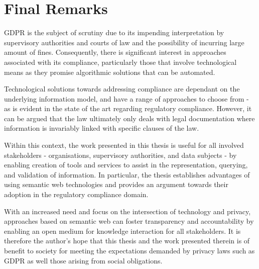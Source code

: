 \section{Final Remarks}\label{sec:conclusion-final-remarks}
GDPR is the subject of scrutiny due to its impending interpretation by supervisory authorities and courts of law and the possibility of incurring large amount of fines. Consequently, there is significant interest in approaches associated with its compliance, particularly those that involve technological means as they promise algorithmic solutions that can be automated.

Technological solutions towards addressing compliance are dependant on the underlying information model, and have a range of approaches to choose from - as is evident in the state of the art regarding regulatory compliance. However, it can be argued that the law ultimately only deals with legal documentation where information is invariably linked with specific clauses of the law.


Within this context, the work presented in this thesis is useful for all involved stakeholders - organisations, supervisory authorities, and data subjects - by enabling creation of tools and services to assist in the representation, querying, and validation of information. In particular, the thesis establishes advantages of using semantic web technologies and provides an argument towards their adoption in the regulatory compliance domain.

With an increased need and focus on the intersection of technology and privacy, approaches based on semantic web can foster transparency and accountability by enabling an open medium for knowledge interaction for all stakeholders. It is therefore the author's hope that this thesis and the work presented therein is of benefit to society for meeting the expectations demanded by privacy laws such as GDPR as well those arising from social obligations. 

